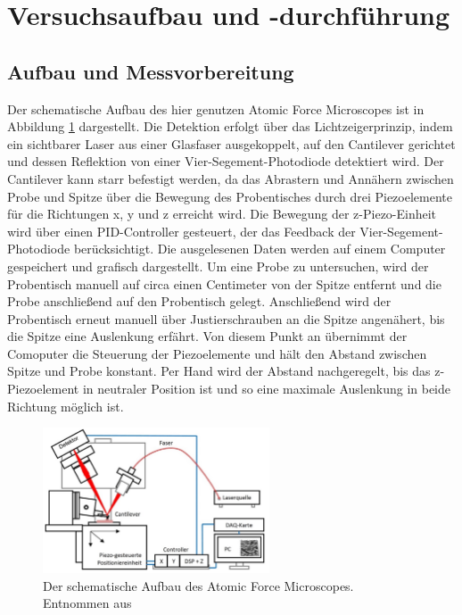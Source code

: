 \newpage
\section{Versuchsaufbau und -durchführung}
  \subsection{Aufbau und Messvorbereitung}
    Der schematische Aufbau des hier genutzen Atomic Force Microscopes ist in Abbildung \ref{fig:Aufbau} dargestellt. Die Detektion erfolgt über das Lichtzeigerprinzip, indem ein sichtbarer Laser
    aus einer Glasfaser ausgekoppelt, auf den Cantilever gerichtet und dessen Reflektion von einer Vier-Segement-Photodiode detektiert wird. Der Cantilever kann starr befestigt werden, da das Abrastern und 
    Annähern zwischen Probe und Spitze über die Bewegung des Probentisches durch drei Piezoelemente für die Richtungen x, y und z erreicht wird. Die Bewegung der z-Piezo-Einheit wird über einen 
    PID-Controller gesteuert, der das Feedback der Vier-Segement-Photodiode berücksichtigt. Die ausgelesenen Daten werden auf einem Computer gespeichert und grafisch dargestellt.
    Um eine Probe zu untersuchen, wird der Probentisch manuell auf circa einen Centimeter von der Spitze entfernt und die Probe anschließend auf den Probentisch gelegt. Anschließend wird der Probentisch
    erneut manuell über Justierschrauben an die Spitze angenähert, bis die Spitze eine Auslenkung erfährt. Von diesem Punkt an übernimmt der Comoputer die Steuerung der Piezoelemente und hält den Abstand 
    zwischen Spitze und Probe konstant. Per Hand wird der Abstand nachgeregelt, bis das z-Piezoelement in neutraler Position ist und so eine maximale Auslenkung in beide Richtung möglich ist.
    \FloatBarrier
    \begin{figure}[h]
      \centering
      \includegraphics[width = 0.6\textwidth]{pictures/Aufbau.png}
      \caption{Der schematische Aufbau des Atomic Force Microscopes. Entnommen aus \cite{tu_dortmund_versuchsanleitung_nodate}}
      \label{fig:Aufbau}
    \end{figure}
    \FloatBarrier

